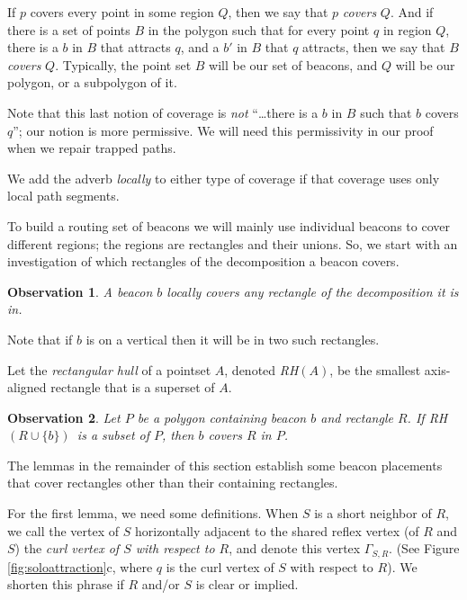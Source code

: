 \documentclass{article}
\newtheorem{obs}{Observation}
\newcommand{\curl}[2]{\ensuremath{\Gamma_{#1, #2}}}
\newcommand{\RH}[1]{\textsl{RH}\ensuremath{(#1)}}
\begin{document}
		If $p$ covers every point in some
		region $Q$, then we say that $p$ \emph{covers} $Q$.
		And if there is a set of points $B$ in the polygon such that for every point
		$q$ in region $Q$, there is a $b$ in $B$ that attracts $q$, and a $b'$ in $B$
		that $q$ attracts, then we say that $B$ \emph{covers} $Q$.
		Typically, the point set $B$ will be our set of beacons, and $Q$ will be our
		polygon, or a subpolygon of it.  
		
		Note that this last notion of coverage is \emph{not} ``\ldots there is a $b$
		in $B$ such that $b$ covers $q$''; our notion is more permissive.  We will
		need this permissivity in our proof when we repair trapped paths.
		
		We add the adverb \emph{locally} to
		either type of coverage if that coverage uses only local path
		segments.
		
		To build a routing set of beacons we will mainly use individual beacons to
		cover different regions; the regions are rectangles and their unions.
		So, we start with an investigation of which rectangles of
		the decomposition a beacon covers.
		
		\begin{obs}\label{obs:contained}
		A beacon $b$ locally covers any rectangle of the decomposition it is in.
		\end{obs}
		Note that if $b$ is on a vertical then it will be in two such rectangles.
		
		Let the \emph{rectangular hull} of a pointset $A$, denoted \RH{A}, be the
		smallest axis-aligned rectangle that is a superset of $A$.

		\begin{obs}\label{obs:hullcontained}
		Let $P$ be a polygon containing beacon $b$ and rectangle $R$.
		If \RH{R \cup \{b\}}\  is a subset of $P$,
		then $b$ covers $R$ in $P$. 
		\end{obs}
		
		The lemmas in the remainder of this section establish some beacon placements
		that cover rectangles other than their containing rectangles. 
		
		For the first lemma, we need some definitions. When $S$ is a short neighbor of
		$R$, we call the vertex of $S$ horizontally adjacent to the shared reflex vertex (of
		$R$ and $S$) the \emph{curl vertex of $S$ with respect to $R$}, and denote this
		vertex \curl{S}{R}. 
		(See Figure \ref{fig:soloattraction}c, where $q$ is the curl vertex of $S$ with respect to
		$R$).
		We shorten this phrase if $R$ and/or $S$ is clear or implied.
		
\end{document}
